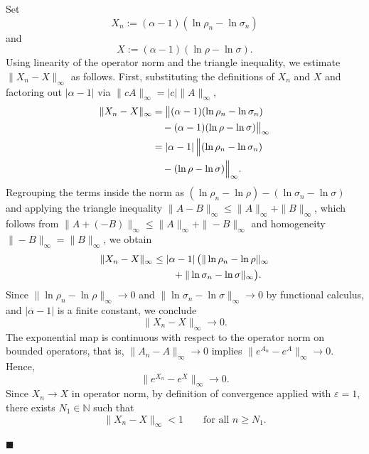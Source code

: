 \documentclass[10pt,a4paper]{amsart}
\renewenvironment{proof}{\noindent{\bfseries Proof.}}{\hfill$\blacksquare$}
\begin{document}
\begin{proof}
Set
\begin{equation}
    X_n := (\alpha-1)(\ln\rho_n-\ln\sigma_n)
\end{equation}
and 
\begin{equation}
    X := (\alpha-1)(\ln\rho-\ln\sigma).
\end{equation}
Using linearity of the operator norm and the triangle inequality, we estimate 
$\|X_n - X\|_\infty$ as follows. First, substituting the definitions of $X_n$ and 
$X$ and factoring out $|\alpha-1|$ via $\|cA\|_\infty = |c|\|A\|_\infty$,
\begin{align}
    \|X_n-X\|_{\infty} 
    &= \bigl\|(\alpha-1)(\ln\rho_n-\ln\sigma_n) \nonumber \\
    &\quad - (\alpha-1)(\ln\rho-\ln\sigma)\bigr\|_{\infty} \nonumber \\
    &= |\alpha-1|\,\Bigl\|(\ln\rho_n - \ln\sigma_n) \nonumber \\
    &\quad - (\ln\rho - \ln\sigma)\Bigr\|_{\infty}.
\end{align}
Regrouping the terms inside the norm as 
$(\ln\rho_n - \ln\rho) - (\ln\sigma_n - \ln\sigma)$
and applying the triangle inequality $\|A - B\|_\infty \le \|A\|_\infty + \|B\|_\infty$,
which follows from $\|A+(-B)\|_\infty \le \|A\|_\infty + \|-B\|_\infty$ and 
homogeneity $\|-B\|_\infty = \|B\|_\infty$, we obtain
\begin{align}
    \|X_n-X\|_{\infty} 
    &\le |\alpha-1|\,\bigl(\|\ln\rho_n - \ln\rho\|_{\infty} \notag\\
    &\qquad + \|\ln\sigma_n - \ln\sigma\|_{\infty}\bigr).
\end{align}
Since $\|\ln\rho_n - \ln\rho\|_\infty \to 0$ and $\|\ln\sigma_n - \ln\sigma\|_\infty \to 0$ 
by functional calculus, and $|\alpha-1|$ is a finite constant, we conclude
\begin{equation}
    \|X_n - X\|_\infty \to 0.
\end{equation}
The exponential map is continuous with respect to the operator norm on bounded 
operators, that is, $\|A_n - A\|_\infty \to 0$ implies 
$\|e^{A_n} - e^{A}\|_\infty \to 0$. Hence,
\begin{equation}
    \|e^{X_n}-e^{X}\|_{\infty}\to 0.
\end{equation}
Since $X_n\to X$ in operator norm, by definition of convergence 
applied with $\varepsilon = 1$, there exists $N_1\in\mathbb{N}$ such that
\begin{equation}
    \|X_n - X\|_{\infty} < 1 \qquad \text{for all } n \ge N_1.
\end{equation}

\end{proof}
\end{document}
